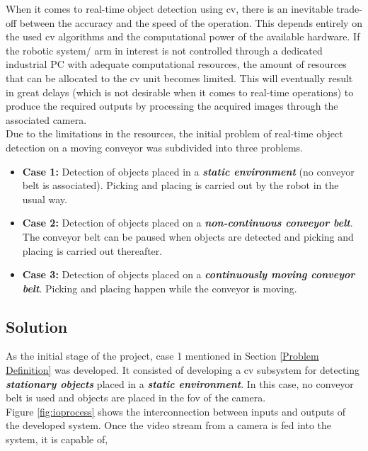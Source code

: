 \documentclass[a4paper,12pt]{report}%
\begin{document}
When it comes to real-time object detection using \ac{cv}, there is an inevitable trade-off between the accuracy and the speed of the operation. This depends entirely on the used \ac{cv} algorithms and the computational power of the available hardware. If the robotic system/ arm in interest is not controlled through a dedicated industrial PC with adequate computational resources, the amount of resources that can be allocated to the \ac{cv} unit becomes limited.  This will eventually result in great delays (which is not desirable when it comes to real-time operations) to produce the required outputs by processing the acquired images through the associated camera.\\

Due to the limitations in the resources, the initial problem of real-time object detection on a moving conveyor was subdivided into three problems.

\begin{itemize}
	\item \textbf{Case 1:} Detection of objects placed in a \textbf{\textit{static environment}} (no conveyor belt is associated). Picking and placing is carried out by the robot in the usual way.
	
	\item  \textbf{Case 2:} Detection of objects placed on a \textbf{\textit{non-continuous conveyor belt}}. The conveyor belt can be paused when objects are detected and picking and placing is carried out thereafter.
	
	\item \textbf{Case 3:} Detection of objects placed on a \textbf{\textit{continuously moving conveyor belt}}. Picking and placing happen while the conveyor is moving.
\end{itemize}



\subsection{Solution}
\label{cv_subsystem}
As the initial stage of the project, case 1 mentioned in Section \ref{Problem Definition} was developed. It consisted of developing a \ac{cv} subsystem for detecting \textbf{\textit{stationary objects}} placed in a \textbf{\textit{static environment}}. In this case, no conveyor belt is used and objects are placed in the \ac{fov} of the camera.\\

Figure \ref{fig:ioprocess} shows the interconnection between inputs and outputs of the developed system. Once the video stream from a camera is fed into the system, it is capable of,
\end{document}

